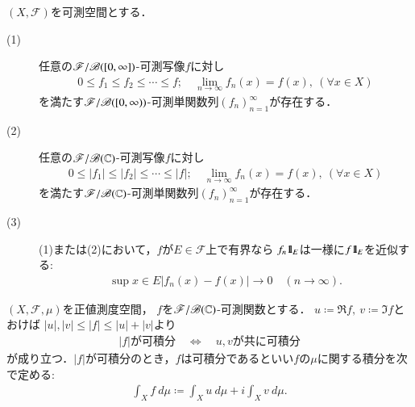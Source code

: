 	\begin{screen}
		\begin{thm}[単関数近似列の存在]
			$(X,\mathscr{F})$を可測空間とする．
			\begin{description} 
				\item[(1)] 任意の$\mathscr{F}/\mathscr{B}([0,\infty])$-可測写像$f$に対し
					\begin{align}
						0 \leq f_1 \leq f_2 \leq \cdots \leq f;
						\quad \lim_{n \to \infty} f_n(x) = f(x),\ (\forall x \in X)
					\end{align}
					を満たす$\mathscr{F}/\mathscr{B}([0,\infty))$-可測単関数列$(f_n)_{n=1}^\infty$が存在する．
					
				\item[(2)]
					 任意の$\mathscr{F}/\mathscr{B}(\mathbb{C})$-可測写像$f$に対し
					\begin{align}
						0 \leq |f_1| \leq |f_2| \leq \cdots \leq |f|;
						\quad \lim_{n \to \infty} f_n(x) = f(x),\ (\forall x \in X)
					\end{align}
					を満たす$\mathscr{F}/\mathscr{B}(\mathbb{C})$-可測単関数列$(f_n)_{n=1}^\infty$が存在する．
				
				\item[(3)] (1)または(2)において，$f$が$E \in \mathscr{F}$上で有界なら
					$f_n \mbox{1}\hspace{-0.25em}\mbox{l}_E$は一様に$f \mbox{1}\hspace{-0.25em}\mbox{l}_E$を近似する:
					\begin{align}
						\sup{x \in E}{\left| f_n(x) - f(x) \right|} \longrightarrow 0
						\quad (n \longrightarrow \infty).
					\end{align}
			\end{description}
		\end{thm}
	\end{screen}
	
	\begin{screen}
		\begin{dfn}[複素数値可測関数の正値測度に関する積分]
			$(X,\mathscr{F},\mu)$を正値測度空間，
			$f$を$\mathscr{F}/\mathscr{B}(\mathbb{C})$-可測関数とする．
			$u \coloneqq \Re{f},\ v \coloneqq \Im{f}$とおけば
			$|u|,|v| \leq |f| \leq |u| + |v|$より
			\begin{align}
				\mbox{$|f|$が可積分} \quad \Longleftrightarrow \quad
				\mbox{$u,v$が共に可積分}
			\end{align}
			が成り立つ．$|f|$が可積分のとき，$f$は可積分であるといい$f$の$\mu$に関する積分を次で定める:
			\begin{align}
				\int_X f\ d\mu
				\coloneqq \int_X u\ d\mu + i \int_X v\ d\mu.
			\end{align}
		\end{dfn}
	\end{screen}
	
